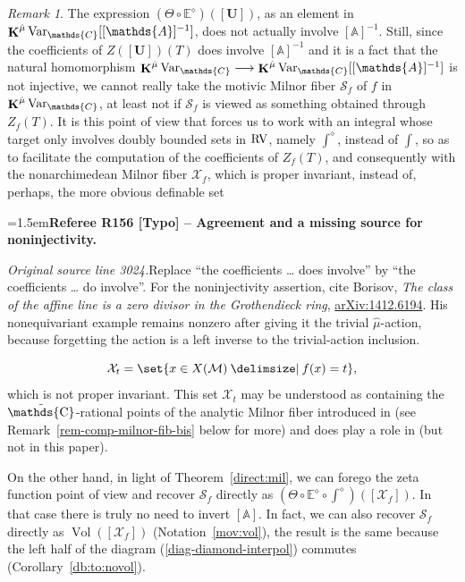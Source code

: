 \documentclass[12pt]{amsart}
\newcommand{\RefereeRemark}[4]{%
  \par\medskip\begingroup\normalfont\small\color{RefereePurple}%
  \emergencystretch=1.5em\noindent\textbf{Referee R#1 [#2] -- #3.}\par\nobreak\noindent #4\par
  \endgroup\medskip
}
\theoremstyle{plain}
\theoremstyle{definition}
\theoremstyle{remark}
\newtheorem{rem}[thm]{Remark}
\numberwithin{equation}{section}
\theoremstyle{plain}
\newcommand{\RV}{\textup{RV}}
\newcommand{\MM}{\mdl M}
\newcommand{\A}{\mathds{A}}
\newcommand{\C}{\mathds{C}}
\newcommand{\0}{\emptyset}
\newcommand{\mdl}[1]{\mathcal{#1}}  %
\newcommand{\bb}[1]{\mathbb{#1}}
\newcommand{\fun}{\longrightarrow}
\providecommand\given{}
\newcommand\SetSymbol[1][]{%
\nonscript \: #1 \vert
\allowbreak
\nonscript\:
\mathopen{}}
\renewcommand\given{\SetSymbol[\delimsize]}
\DeclareMathOperator{\ggk}{\mathbf{K}}
\newcommand{\var}{\textup{Var}}
\DeclareMathOperator{\puC}{\tilde \C}
\DeclareMathOperator{\Vol}{Vol}
\newcommand{\gmv}{\ggk^{\hat \mu}\var_{\C}}
\begin{document}
\begin{rem}\label{rem-comp-milnor-fib}
The expression $(\Theta \circ \bb E^{\diamond})([\bm U])$, as an element in $\gmv[[\A]^{-1}]$, does not actually involve  $[\A]^{-1}$. Still, since the coefficients of $Z([\bm U])(T)$ does involve $[\A]^{-1}$ and it is a fact that the natural homomorphism $\gmv \fun \gmv[[\A]^{-1}]$ is not injective, we cannot really take  the motivic Milnor fiber $\mathscr S_f$ of $f$ in $\gmv$, at least not if $\mathscr S_f$ is viewed as something obtained through  $Z_f(T)$. It is this point of view that forces us to work with an integral whose target only involves doubly bounded sets in $\RV$, namely $\int^{\diamond}$, instead of $\int$, so as to facilitate the computation of the coefficients of $Z_f(T)$, and consequently with the nonarchimedean Milnor fiber $\mdl X_f$, which is proper invariant, instead of, perhaps, the more obvious definable set

\RefereeRemark{156}{Typo}{Agreement and a missing source for noninjectivity}{%
\textit{Original source line 3024.}\quad Replace ``the coefficients \ldots{} does involve'' by ``the coefficients \ldots{} do involve''. For the noninjectivity assertion, cite Borisov, \emph{The class of the affine line is a zero divisor in the Grothendieck ring}, \href{https://arxiv.org/abs/1412.6194}{arXiv:1412.6194}. His nonequivariant example remains nonzero after giving it the trivial $\hat\mu$-action, because forgetting the action is a left inverse to the trivial-action inclusion.
}
\[
\mdl X_t = \set{x \in X(\MM) \given f(x) = t},
\]
which is not proper invariant. This set $\mdl X_t$ may be understood as containing the $\puC$-rational points of  the analytic Milnor fiber introduced in \cite{nicaise:sebag:motivic:serre} (see Remark~\ref{rem-comp-milnor-fib-bis} below for more) and does play a role in \cite{hru:loe:lef} (but not in this paper).


On the other hand, in light of Theorem~\ref{direct:mil}, we can forego the zeta function point of view and recover $\mathscr S_f$ directly as $(\Theta \circ \bb E^{\diamond} \circ \int^{\diamond})([\mdl X_f])$. In that case there is truly no need to invert $[\A]$. In fact, we can also recover $\mathscr S_f$  directly as  $\Vol([\mdl X_f])$ (Notation~\ref{mov:vol}), the result is the same because the left half of the diagram (\ref{diag-diamond-interpol}) commutes (Corollary~\ref{db:to:novol}).
\end{rem}
\end{document}
